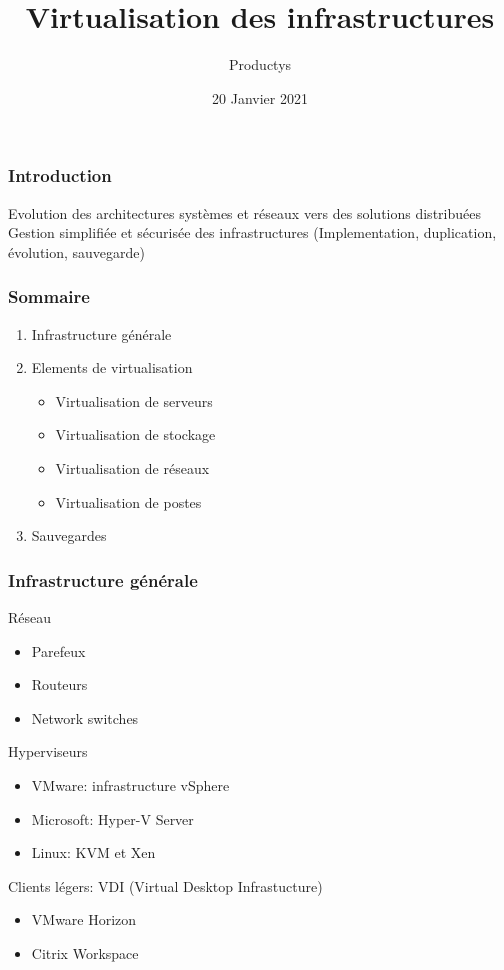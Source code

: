 \documentclass{beamer}
\title{Virtualisation des infrastructures}
\author{Productys}
\date{20 Janvier 2021}
\begin{document}

\frame{\titlepage}



\begin{frame}
\frametitle{Introduction}
Evolution des architectures systèmes et réseaux vers des solutions distribuées
\medbreak
Gestion simplifiée et sécurisée des infrastructures (Implementation, duplication, évolution, sauvegarde)

\end{frame}


\begin{frame}
    \frametitle{Sommaire}
    
    \begin{enumerate}
        \item Infrastructure générale
        \item Elements de virtualisation
        \begin{itemize}
            \item Virtualisation de serveurs
            \item Virtualisation de stockage
            \item Virtualisation de réseaux
            \item Virtualisation de postes
        \end{itemize}
        \item Sauvegardes
    \end{enumerate}
    
    \end{frame}
    


\begin{frame}
\frametitle{Infrastructure générale}
Réseau
\begin{itemize}
    \item Parefeux
    \item Routeurs
    \item Network switches
\end{itemize}

Hyperviseurs
\begin{itemize}
    \item VMware: infrastructure vSphere
    \item Microsoft: Hyper-V Server
    \item Linux: KVM et Xen
\end{itemize}

Clients légers: VDI (Virtual Desktop Infrastucture)
\begin{itemize}
    \item VMware Horizon
    \item Citrix Workspace
\end{itemize}
\end{frame}
\end{document}
